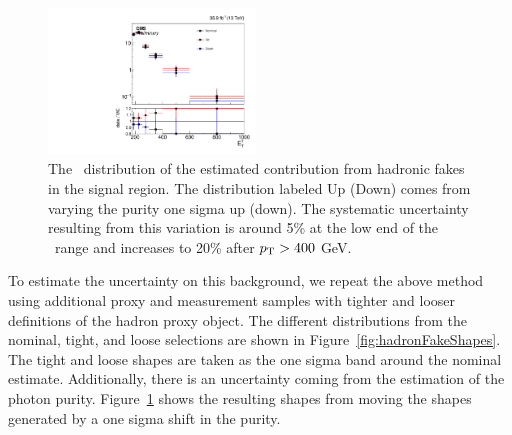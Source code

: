 \begin{figure}[htbp]
  \begin{center}
    \includegraphics[width=0.49\textwidth]{Analysis/Figures/hfake/shape_purity.pdf}
    \caption{
      The \pt\ distribution of the estimated contribution from hadronic fakes in the signal region. 
      The distribution labeled Up (Down) comes from varying the purity one sigma up (down). 
      The systematic uncertainty resulting from this variation is around 5\% at the low end of the \pt\ range and increases to 20\% after $p_{\mathrm{T}} > 400$ GeV.
    }
    \label{fig:hadronFakePurity}
  \end{center}
\end{figure}

To estimate the uncertainty on this background, we repeat the above method using additional proxy and measurement samples with tighter and looser definitions of the hadron proxy object.
The different distributions from the nominal, tight, and loose selections are shown in Figure~\ref{fig:hadronFakeShapes}. 
The tight and loose shapes are taken as the one sigma band around the nominal estimate. 
Additionally, there is an uncertainty coming from the estimation of the photon purity. 
Figure~\ref{fig:hadronFakePurity} shows the resulting shapes from moving the shapes generated by a one sigma shift in the purity.
